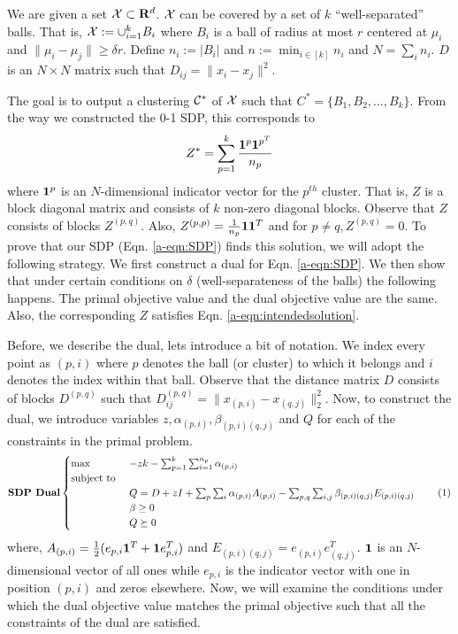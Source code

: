We are given a set $\mathcal X \subset \mathbf R^d$. $\mathcal X$ can be covered by a set of $k$ ``well-separated'' balls. That is, $\mathcal X := \cup_{i=1}^k B_i$ where $B_i$ is a ball of radius at most $r$ centered at $\mu_i$ and $\|\mu_i - \mu_j\| \ge \delta r$. %
Define $n_i := |B_i|$ and $n := \min_{i\in[k]} n_i$ and $N = \sum_i n_i$. $D$ is an $N\times N$ matrix such that $D_{ij} = \|x_i -x_j\|^2$.  

The goal is to output a clustering $\mathcal C^*$ of $\mathcal X$ such that $C^* = \{B_1, B_2, \ldots, B_k\}$. From the way we constructed the 0-1 SDP, this corresponds to
\begin{align}
  Z^* = \sum_{p=1}^k \frac{\mathbf 1^p \mathbf 1^{p^T}}{n_p} \label{a-eqn:intendedsolution}
\end{align}
where $\mathbf 1^p$ is an $N$-dimensional indicator vector for the $p^{th}$ cluster. That is, $Z$ is a block diagonal matrix and consists of $k$ non-zero diagonal blocks. Observe that $Z$ consists of blocks $Z^{(p, q)}$. Also, $Z^{(p, p)} = \frac{1}{n_p}\mathbf 1\mathbf 1^T$ and for $p \neq q, Z^{(p, q)} = 0$. To prove that our SDP (Eqn. \ref{a-eqn:SDP}) finds this solution, we  will adopt the following strategy. We first construct a dual for Eqn. \ref{a-eqn:SDP}. We then show that under certain conditions on $\delta$ (well-separateness of the balls) the following happens. The primal objective value and the dual objective value are the same. Also, the corresponding $Z$ satisfies Eqn. \ref{a-eqn:intendedsolution}. 

Before, we describe the dual, lets introduce a bit of notation. We index every point as $(p, i)$ where $p$ denotes the ball (or cluster) to which it belongs and $i$ denotes the index within that ball. Observe that the distance matrix $D$ consists of blocks $D^{(p, q)}$ such that $D^{(p,q)}_{ij} = \|x_{(p,i)}-x_{(q,j)}\|^2_2$. Now, to construct the dual, we introduce variables $z, \alpha_{(p,i)}, \beta_{(p,i)(q,j)}$ and $Q$ for each of the constraints in the primal problem. 
\[\textbf{SDP Dual}
    \begin{cases}
		\max \enspace &-zk - \sum_{p=1}^{k}\sum_{i=1}^{n_p} \alpha_{(p,i)}\\
		\text{subject to } \\
		&Q = D + zI + \sum_p\sum_i \alpha_{(p,i)}A_{(p, i)} -\sum_{p,q}\sum_{i,j} \beta_{(p,i)(q,j)}E_{(p,i)(q,j)}\\
		&\beta \ge 0 \\
		&Q \succeq 0
	\end{cases}
	\label{a-eqn:SDPDual}
	\numberthis
\]
where, $A_{(p,i)} = \frac{1}{2}(e_{p,i}\mathbf 1^T + \mathbf 1 e_{p, i}^T)$ and $E_{(p,i)(q,j)} = e_{(p,i)}e_{(q,j)}^T$. $\mathbf 1$ is an $N$-dimensional vector of all ones while $e_{p,i}$ is the indicator vector with one in position $(p, i)$ and zeros elsewhere. Now, we will examine the conditions under which the dual objective value matches the primal objective such that all the constraints of the dual are satisfied. 
